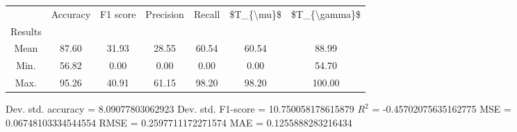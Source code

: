 \begin{tabular}{|c|c|c|c|c|c|c|}
\toprule
{} &  Accuracy &  F1 score &  Precision &  Recall &  \$T\_\{\textbackslash mu\}\$ &  \$T\_\{\textbackslash gamma\}\$ \\
Results &           &           &            &         &            &               \\
\hline
Mean    &     87.60 &     31.93 &      28.55 &   60.54 &      60.54 &         88.99 \\
Min.    &     56.82 &      0.00 &       0.00 &    0.00 &       0.00 &         54.70 \\
Max.    &     95.26 &     40.91 &      61.15 &   98.20 &      98.20 &        100.00 \\
\bottomrule
\end{tabular}

 Dev. std. accuracy = 8.09077803062923
 Dev. std. F1-score = 10.750058178615879
 $R^2$ = -0.45702075635162775
 MSE = 0.06748103334544554
 RMSE = 0.2597711172271574
 MAE = 0.1255888283216434
